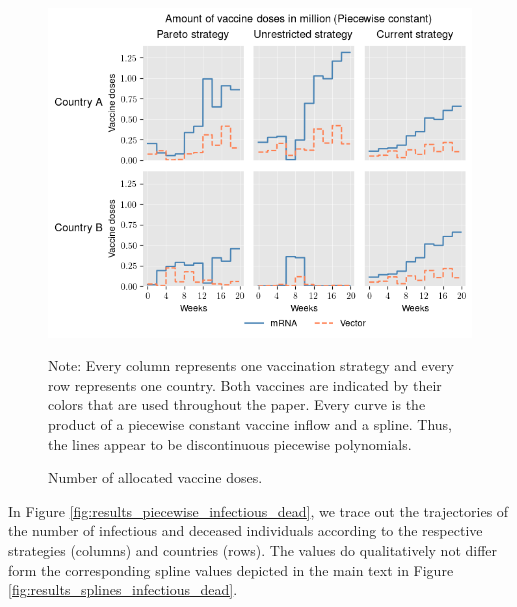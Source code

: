 \begin{figure}[h!]
\centering
\includegraphics[scale=0.65]{images/piecewise_vaccine_total_quantity.png}\\
\begin{flushleft}
\scriptsize{Note:} Every column represents one vaccination strategy and every row represents one country. Both vaccines are indicated by their colors that are used throughout the paper. 
Every curve is the product of a piecewise constant vaccine inflow and a spline. Thus, the lines appear to be discontinuous piecewise polynomials. 
\end{flushleft}
\caption{Number of allocated vaccine doses.}
\label{fig:results_piecewise_allocation}
\end{figure}

In Figure \ref{fig:results_piecewise_infectious_dead}, we trace out the trajectories of the number of infectious and deceased individuals according to the respective strategies (columns) and countries (rows). The values do qualitatively not differ form the corresponding spline values depicted in the main text in Figure \ref{fig:results_splines_infectious_dead}.\\

